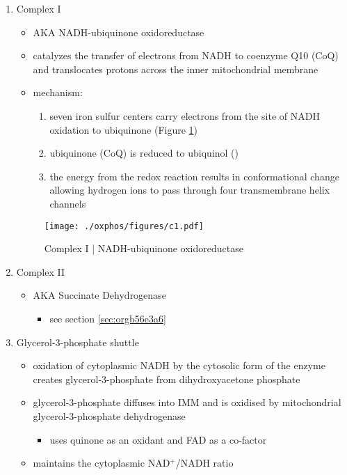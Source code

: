\documentclass{scrartcl}
\begin{document}
\begin{enumerate}
\item Complex I
\label{sec:org00209d0}
\begin{itemize}
\item AKA NADH-ubiquinone oxidoreductase
\item catalyzes the transfer of electrons from NADH to coenzyme Q10
(CoQ) and translocates protons across the inner mitochondrial
membrane
\end{itemize}

{\small{}}

\begin{itemize}
\item mechanism: 
\begin{enumerate}
\item seven iron sulfur centers carry electrons from the site of NADH
oxidation to ubiquinone (Figure \ref{fig:orgbaa4939})
\item ubiquinone (CoQ) is reduced to ubiquinol ()
\item the energy from the redox reaction results in conformational
change allowing hydrogen ions to pass through four transmembrane
helix channels
\end{enumerate}
\end{itemize}

\begin{figure}[htbp]
\centering
\texttt{[image: ./oxphos/figures/c1.pdf]}
\caption[c1]{\label{fig:orgbaa4939}
Complex I | NADH-ubiquinone oxidoreductase}
\end{figure}

\item Complex II
\label{sec:orgfa04fcd}
\begin{itemize}
\item AKA Succinate Dehydrogenase 
\begin{itemize}
\item see section \ref{sec:orgb56e3a6}
\end{itemize}
\end{itemize}

\item Glycerol-3-phosphate shuttle
\label{sec:org099b2a6}
\begin{itemize}
\item oxidation of cytoplasmic NADH by the cytosolic form of the enzyme
creates glycerol-3-phosphate from dihydroxyacetone phosphate
\item glycerol-3-phosphate diffuses into IMM and is oxidised by mitochondrial glycerol-3-phosphate dehydrogenase
\begin{itemize}
\item uses quinone as an oxidant and FAD as a co-factor
\end{itemize}
\item maintains the cytoplasmic NAD\(^{\text{+}}\)/NADH ratio
\end{itemize}


\end{enumerate}
\end{document}
